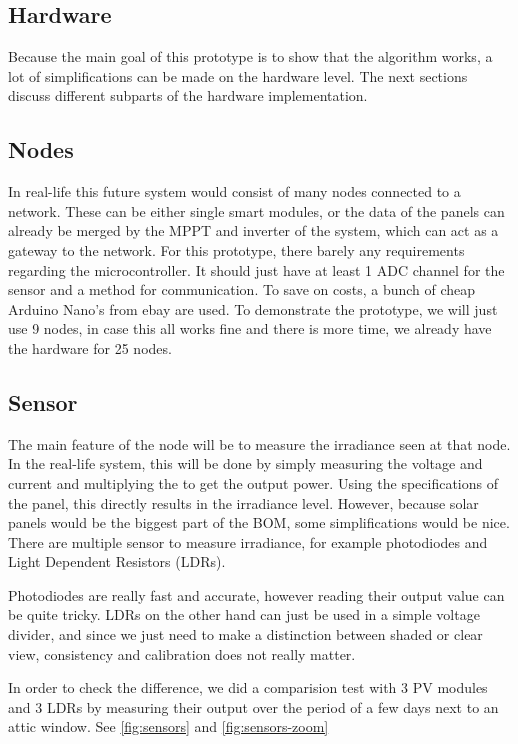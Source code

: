 \documentclass[a4paper,journal]{DDREAM}
\begin{document}
\subsection{Hardware}\label{sec:implementation-hardware}
Because the main goal of this prototype is to show that the algorithm works, a lot of simplifications can be made on the hardware level.
The next sections discuss different subparts of the hardware implementation.

\subsection{Nodes}
In real-life this future system would consist of many nodes connected to a network.
These can be either single smart modules, or the data of the panels can already be merged by the MPPT and inverter of the system, which can act as a gateway to the network.
For this prototype, there barely any requirements regarding the microcontroller.
It should just have at least 1 ADC channel for the sensor and a method for communication.
To save on costs, a bunch of cheap Arduino Nano's from ebay are used.
To demonstrate the prototype, we will just use 9 nodes, in case this all works fine and there is more time, we already have the hardware for 25 nodes.

\subsection{Sensor}
The main feature of the node will be to measure the irradiance seen at that node.
In the real-life system, this will be done by simply measuring the voltage and current and multiplying the to get the output power.
Using the specifications of the panel, this directly results in the irradiance level.
However, because solar panels would be the biggest part of the BOM, some simplifications would be nice.
There are multiple sensor to measure irradiance, for example photodiodes and Light Dependent Resistors (LDRs).

Photodiodes are really fast and accurate, however reading their output value can be quite tricky.
LDRs on the other hand can just be used in a simple voltage divider, and since we just need to make a distinction between shaded or clear view, consistency and calibration does not really matter.

In order to check the difference, we did a comparision test with 3 PV modules and 3 LDRs by measuring their output over the period of a few days next to an attic window.
See \autoref{fig:sensors} and \autoref{fig:sensors-zoom}
\end{document}
